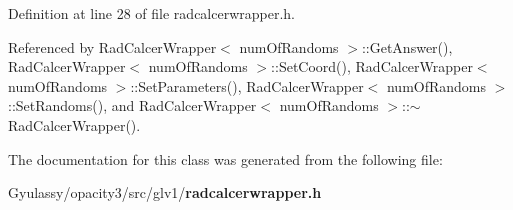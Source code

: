 Definition at line 28 of file radcalcerwrapper.h.

Referenced by RadCalcerWrapper$<$ numOfRandoms $>$::GetAnswer(), RadCalcerWrapper$<$ numOfRandoms $>$::SetCoord(), RadCalcerWrapper$<$ numOfRandoms $>$::SetParameters(), RadCalcerWrapper$<$ numOfRandoms $>$::SetRandoms(), and RadCalcerWrapper$<$ numOfRandoms $>$::$\sim$RadCalcerWrapper().

The documentation for this class was generated from the following file:\begin{CompactItemize}
\item 
Gyulassy/opacity3/src/glv1/{\bf radcalcerwrapper.h}\end{CompactItemize}
